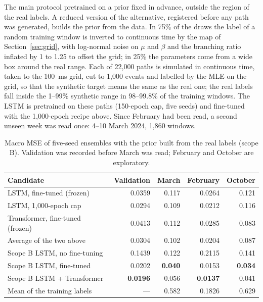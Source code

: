 \documentclass[preprint,12pt,authoryear]{elsarticle}
\begin{document}
The main protocol pretrained on a prior fixed in advance, outside the region of the real
labels. A reduced version of the alternative, registered before any path was generated,
builds the prior from the data. In 75\% of the draws the label of a random training window
is inverted to continuous time by the map of Section~\ref{sec:grid}, with log-normal noise on
$\mu$ and $\beta$ and the branching ratio inflated by 1 to 1.25 to offset the grid; in 25\%
the parameters come from a wide box around the real range. Each of 22,000 paths is simulated
in continuous time, taken to the 100~ms grid, cut to 1,000 events and labelled by the MLE on
the grid, so that the synthetic target means the same as the real one; the real labels fall
inside the 1--99\% synthetic range in 98--99.8\% of the training windows. The LSTM is
pretrained on these paths (150-epoch cap, five seeds) and fine-tuned with the 1,000-epoch
recipe above. Since February had been read, a second unseen week was read once: 4--10 March
2024, 1,860 windows.

\begin{table}[t]
\centering
\caption{Macro MSE of five-seed ensembles with the prior built from the real labels (scope B).
Validation was recorded before March was read; February and October are exploratory.}
\label{tab:scope-b}
\small
\begin{tabular}{lrrrr}
\toprule
Candidate & Validation & March & February & October\\
\midrule
LSTM, fine-tuned (frozen) & 0.0359 & 0.117 & 0.0264 & 0.121\\
LSTM, 1,000-epoch cap & 0.0294 & 0.109 & 0.0212 & 0.116\\
Transformer, fine-tuned (frozen) & 0.0413 & 0.112 & 0.0285 & 0.083\\
Average of the two above & 0.0304 & 0.102 & 0.0204 & 0.087\\
Scope B LSTM, no fine-tuning & 0.1439 & 0.122 & 0.2115 & 0.141\\
Scope B LSTM, fine-tuned & 0.0202 & \textbf{0.040} & 0.0153 & \textbf{0.034}\\
Scope B LSTM + Transformer & \textbf{0.0196} & 0.056 & \textbf{0.0137} & 0.041\\
Mean of the training labels & --- & 0.582 & 0.1826 & 0.629\\
\bottomrule
\end{tabular}
\end{table}
\end{document}
